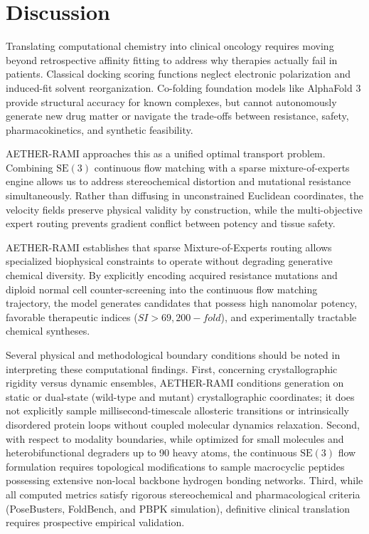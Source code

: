 \documentclass[11pt,a4paper]{article}
\begin{document}
\section*{Discussion}
Translating computational chemistry into clinical oncology requires moving beyond retrospective affinity fitting to address why therapies actually fail in patients. Classical docking scoring functions neglect electronic polarization and induced-fit solvent reorganization. Co-folding foundation models like AlphaFold 3 provide structural accuracy for known complexes, but cannot autonomously generate new drug matter or navigate the trade-offs between resistance, safety, pharmacokinetics, and synthetic feasibility.

AETHER-RAMI approaches this as a unified optimal transport problem. Combining $\mathrm{SE}(3)$ continuous flow matching with a sparse mixture-of-experts engine allows us to address stereochemical distortion and mutational resistance simultaneously. Rather than diffusing in unconstrained Euclidean coordinates, the velocity fields preserve physical validity by construction, while the multi-objective expert routing prevents gradient conflict between potency and tissue safety.

AETHER-RAMI establishes that sparse Mixture-of-Experts routing allows specialized biophysical constraints to operate without degrading generative chemical diversity. By explicitly encoding acquired resistance mutations and diploid normal cell counter-screening into the continuous flow matching trajectory, the model generates candidates that possess high nanomolar potency, favorable therapeutic indices ($SI >69,200-fold$), and experimentally tractable chemical syntheses.

Several physical and methodological boundary conditions should be noted in interpreting these computational findings. First, concerning crystallographic rigidity versus dynamic ensembles, AETHER-RAMI conditions generation on static or dual-state (wild-type and mutant) crystallographic coordinates; it does not explicitly sample millisecond-timescale allosteric transitions or intrinsically disordered protein loops without coupled molecular dynamics relaxation. Second, with respect to modality boundaries, while optimized for small molecules and heterobifunctional degraders up to 90 heavy atoms, the continuous $\mathrm{SE}(3)$ flow formulation requires topological modifications to sample macrocyclic peptides possessing extensive non-local backbone hydrogen bonding networks. Third, while all computed metrics satisfy rigorous stereochemical and pharmacological criteria (PoseBusters, FoldBench, and PBPK simulation), definitive clinical translation requires prospective empirical validation. 
\end{document}
